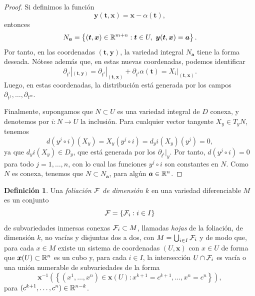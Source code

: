 \documentclass[11pt,a4paper]{amsbook}
\theoremstyle{remark} \newtheorem{rmk}[subsection]{Observación}
\theoremstyle{definition} \newtheorem{defn}[subsection]{Definición}
\theoremstyle{definition} \newtheorem{ex}[subsection]{Ejemplo}
\theoremstyle{definition} \newtheorem{ej}[subsection]{Ejercicio}
\begin{document}
\begin{proof}
Si definimos la función
\begin{equation*}
\bm{y}(\bm{t},\bm{x}) = \bm{x} - \alpha(\bm{t}),
\end{equation*}
entonces
\begin{equation*}
N_{\bm{a}} = \left\{ (\bm{t},\bm{x}) \in \mathbb R^{m+n}: \bm{t}\in U,\ \bm{y}(\bm{t},\bm{x}) = \bm{a} \right\}.
\end{equation*}
Por tanto, en las coordenadas $(\bm{t},\bm{y})$, la variedad integral $N_{\bm{a}}$ tiene la forma deseada. Nótese además que, en estas nuevas coordenadas, podemos identificar
\begin{equation*}
\partial_{t^i}|_{(\bm{t},\bm{y})} = \partial_{t^i}|_{(\bm{t},\bm{x})} + \partial_{t^i}\alpha(\bm{t}) = X_i|_{(\bm{t},\bm{x})}.
\end{equation*}
Luego, en estas coordenadas, la distribución está generada por los campos $\partial_{t^1},\dots,\partial_{t^m}$.

Finalmente, supongamos que $N\subset U$ es una variedad integral de $D$ conexa, y denotemos por $i:N\rightarrow U$ la inclusión. Para cualquier vector tangente $X_y\in T_yN$, tenemos
\begin{equation*}
d(y^j\circ i)(X_y) = X_y(y^j \circ i) = d_yi(X_y) (y^j) = 0,
\end{equation*}
ya que $d_yi(X_y)\in D_y$, que está generada por los $\partial_{t^i}|_{y}$. Por tanto, $d(y^j\circ i)=0$ para todo $j=1,\dots,n$, con lo cual las funciones $y^j\circ i$ son constantes en $N$. Como $N$ es conexa, tenemos que $N\subset N_{\bm{a}}$, para algún $\bm{a}\in \mathbb R^n$.
\end{proof}

\begin{defn}
  Una \emph{foliación} $\mathcal F$ \emph{de dimensión $k$} en una variedad diferenciable $M$ es un conjunto
  \begin{equation*}
\mathcal F = \left\{ \mathcal F_i: i\in I \right\}
  \end{equation*}
  de subvariedades inmersas conexas $\mathcal F_i \subset M$, llamadas \emph{hojas} de la foliación, de dimensión $k$, no vacías y disjuntas dos a dos, con $M=\bigcup_{i\in I} \mathcal F_i$ y de modo que, para cada $x\in M$ existe un sistema de coordenadas $(U,\bm{x})$ con $x\in U$ de forma que $\bm{x}(U)\subset \mathbb R^n$ es un cubo y, para cada $i\in I$, la intersección $U\cap \mathcal F_i$ es vacía o una unión numerable de subvariedades de la forma
  \begin{equation*}
\bm{x}^{-1}\left(\left\{ (x^1,\dots,x^n)\in \bm{x}(U): x^{k+1}=c^{k+1},\dots,x^{n}=c^n \right\}\right),
  \end{equation*}
para $(c^{k+1},\dots,c^n)\in \mathbb R^{n-k}$.
\end{defn}
\end{document}
